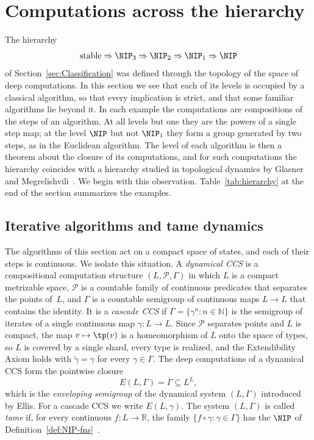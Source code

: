 \section{Computations across the hierarchy}
\label{sec:iterative}

The hierarchy
\[
\text{stable}\Rightarrow\NIP_3\Rightarrow\NIP_2\Rightarrow\NIP_1\Rightarrow\NIP
\]
of Section~\ref{sec:Classification} was defined through the topology of the
space of deep computations.
In this section we see that each of its levels is occupied by a classical
algorithm, so that every implication is strict, and that some familiar
algorithms lie beyond it.
In each example the computations are compositions of the steps of an
algorithm.
At all levels but one they are the powers of a single step map; at the level
$\NIP$ but not $\NIP_1$ they form a group generated by two steps, as in the
Euclidean algorithm.
The level of each algorithm is then a theorem about the closure of its
computations, and for such computations the hierarchy coincides with a
hierarchy studied in topological dynamics by Glasner and
Megrelishvili~\cite{glasner2022tame}.
We begin with this observation.
Table~\ref{tab:hierarchy} at the end of the section summarizes the examples.

\subsection{Iterative algorithms and tame dynamics}
\label{sec:dynamical-CCS}
The algorithms of this section act on a compact space of states, and each
of their steps is continuous.
We isolate this situation.
A \emph{dynamical CCS} is a compositional computation structure
$(L,\mathcal{P},\Gamma)$ in which $L$ is a compact metrizable space,
$\mathcal{P}$ is a countable family of continuous predicates that
separates the points of~$L$, and $\Gamma$ is a countable semigroup of
continuous maps $L\to L$ that contains the identity.
It is a \emph{cascade CCS} if $\Gamma=\{\gamma^n:n\in\mathbb{N}\}$ is the
semigroup of iterates of a single continuous map $\gamma\colon L\to L$.
Since $\mathcal{P}$ separates points and $L$ is compact, the map
$v\mapsto\tp(v)$ is a homeomorphism of $L$ onto the space of types, so $L$ is
covered by a single shard, every type is realized, and the Extendibility Axiom
holds with $\tilde\gamma=\gamma$ for every $\gamma\in\Gamma$.
The deep computations of a dynamical CCS form the pointwise closure
\[
E(L,\Gamma)=\overline{\Gamma}\subseteq L^L ,
\]
which is the \emph{enveloping semigroup} of the dynamical system $(L,\Gamma)$
introduced by Ellis.
For a cascade CCS we write $E(L,\gamma)$.
The system $(L,\Gamma)$ is called \emph{tame} if, for every continuous
$f\colon L\to\mathbb{R}$, the family $\{f\circ\gamma:\gamma\in\Gamma\}$ has the
$\NIP$ of Definition~\ref{def:NIP-fns}~\cite{Kohler1995,Glasner2006}.

